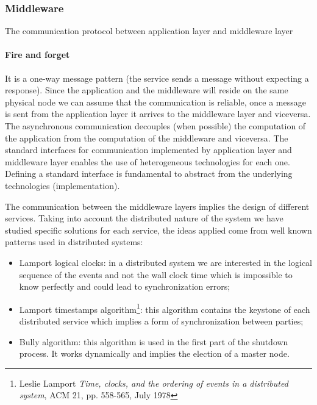 \subsubsection{Middleware}
The communication protocol between application layer and middleware layer 
\paragraph{Fire and forget} 
It is a one-way message pattern (the service sends a message without expecting 
a response). Since the application and the middleware will reside on the same 
physical node we can assume that the communication is reliable, once a message 
is sent from the application layer it arrives to the middleware layer and 
viceversa. The asynchronous communication decouples (when possible) 
the computation of the application from the computation of the middleware 
and viceversa. The standard interfaces for communication 
implemented by application layer and middleware layer enables the use of 
heterogeneous technologies for each one. Defining a standard interface 
is fundamental to abstract from the underlying technologies (implementation).


The communication between the middleware layers implies the design of different 
services. Taking into account the distributed nature of the system we have 
studied specific solutions for each service, the ideas applied come from 
well known patterns used in distributed systems:
\begin{itemize}
  \item Lamport logical clocks: in a distributed system we are interested 
in the logical sequence of the events and not the wall clock time which is 
impossible to know perfectly and could lead to synchronization errors;
  \item Lamport timestamps algorithm\footnote{Leslie Lamport \textit{Time, 
clocks, and the ordering of events in a distributed system}, ACM 21, 
pp. 558-565, July 1978}: this algorithm contains the keystone 
of each distributed service which implies a form of synchronization 
between parties;
  \item Bully algorithm: this algorithm is used in the first part of the 
shutdown process. It works dynamically and implies the election of a master 
node. 
\end{itemize}

